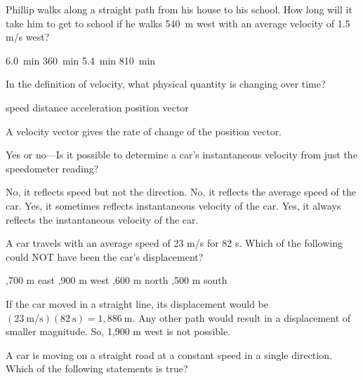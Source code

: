 \documentclass[answers]{exam}
\begin{document}
\begin{questions}
\begin{questions}
\question %
Phillip walks along a straight path from his house to his school. How long will it take him to get to school if he walks \SI{540}{m} west with an average velocity of 1.5 m/s west?

\begin{choices}
\CorrectChoice \SI{6.0}{min}
\choice \SI{360}{min}
\choice \SI{5.4}{min}
\choice \SI{810}{min}


\end{choices}

\question
In the definition of velocity, what physical quantity is changing over time?

\begin{choices}
\choice speed
\choice distance
\choice acceleration
\CorrectChoice position vector
\end{choices}

\begin{solution}
A velocity vector gives the rate of change of the position vector.
\end{solution}

\question
Yes or no---Is it possible to determine a car’s instantaneous velocity from just the speedometer reading?

\begin{choices}
\CorrectChoice No, it reflects speed but not the direction.
\choice No, it reflects the average speed of the car.
\choice Yes, it sometimes reflects instantaneous velocity of the car.
\choice Yes, it always reflects the instantaneous velocity of the car.
\end{choices}

\question
A car travels with an average speed of 23 m/s for 82 s. Which of the following could NOT have been the car's displacement?

\begin{choices}
,700 m east
,900 m west
,600 m north
,500 m south
\end{choices}

\begin{solution}
If the car moved in a straight line, its displacement would be $(23\ \mathrm{m/s})(82\ \mathrm{s}) = 1,886\ \mathrm{m}$. Any other path would result in a displacement of smaller magnitude. So, 1,900 m west is not possible.
\end{solution}

\question 
A car is moving on a straight road at a constant speed in a single direction. Which of the following statements is true?


\end{questions}
\end{questions}
\end{document}
